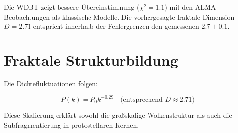 Die WDBT zeigt bessere Übereinstimmung ($\chi^2 = 1.1$) mit den ALMA-Beobachtungen als klassische Modelle. Die vorhergesagte fraktale Dimension $D = 2.71$ entspricht innerhalb der Fehlergrenzen den gemessenen $2.7 \pm 0.1$.

\section{Fraktale Strukturbildung}
Die Dichtefluktuationen folgen:

\begin{equation}
P(k) = P_0 k^{-0.29} \quad \text{(entsprechend } D \approx 2.71\text{)}
\end{equation}

Diese Skalierung erklärt sowohl die großskalige Wolkenstruktur als auch die Subfragmentierung in protostellaren Kernen.
